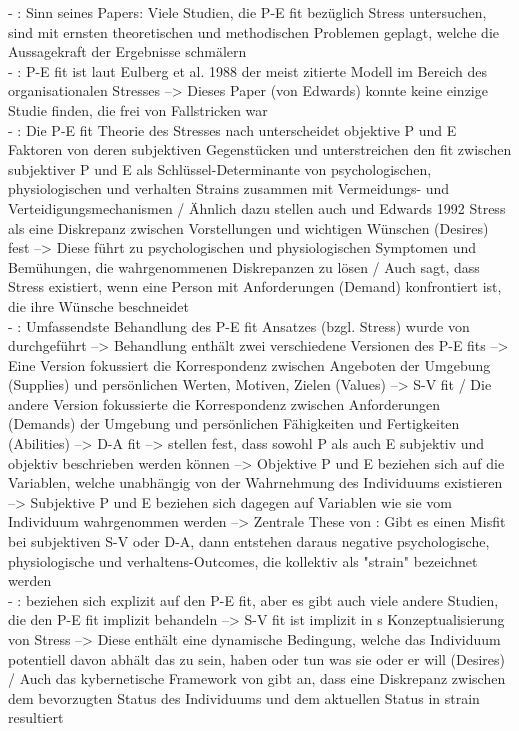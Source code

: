 - \cite[S. 2]{edwards:1990}: Sinn seines Papers: Viele Studien, die P-E fit bezüglich Stress untersuchen, sind mit ernsten theoretischen und methodischen Problemen geplagt, welche die Aussagekraft der Ergebnisse schmälern \\
- \cite[S. 2]{edwards:1990}: P-E fit ist laut Eulberg et al. 1988 der meist zitierte Modell im Bereich des organisationalen Stresses --> Dieses Paper (von Edwards) konnte keine einzige Studie finden, die frei von Fallstricken war \\
- \cite[S. 4]{edwards:2017}: Die P-E fit Theorie des Stresses nach \cite{mechanismsOfJobStressAndStrain:1982} unterscheidet objektive P und E Faktoren von deren subjektiven Gegenstücken und unterstreichen den fit zwischen subjektiver P und E als Schlüssel-Determinante von psychologischen, physiologischen und verhalten Strains zusammen mit Vermeidungs- und Verteidigungsmechanismen / Ähnlich dazu stellen auch \cite{cummings:1979} und Edwards 1992 Stress als eine Diskrepanz zwischen Vorstellungen und wichtigen Wünschen (Desires) fest --> Diese führt zu psychologischen und physiologischen Symptomen und Bemühungen, die wahrgenommenen Diskrepanzen zu lösen / Auch \cite{schuler:1980} sagt, dass Stress existiert, wenn eine Person mit Anforderungen (Demand) konfrontiert ist, die ihre Wünsche beschneidet\\
- \cite[S. 2]{edwards:1990}: Umfassendste Behandlung des P-E fit Ansatzes (bzgl. Stress) wurde von \textcite{mechanismsOfJobStressAndStrain:1982} durchgeführt --> Behandlung enthält zwei verschiedene Versionen des P-E fits --> Eine Version fokussiert die Korrespondenz zwischen Angeboten der Umgebung (Supplies) und persönlichen Werten, Motiven, Zielen (Values) --> S-V fit / Die andere Version fokussierte die Korrespondenz zwischen Anforderungen (Demands) der Umgebung und persönlichen Fähigkeiten und Fertigkeiten (Abilities) --> D-A fit --> \textcite{mechanismsOfJobStressAndStrain:1982} stellen fest, dass sowohl P als auch E subjektiv und objektiv beschrieben werden können --> Objektive P und E beziehen sich auf die Variablen, welche unabhängig von der Wahrnehmung des Individuums existieren --> Subjektive P und E beziehen sich dagegen auf Variablen wie sie vom Individuum wahrgenommen werden --> Zentrale These von \textcite{mechanismsOfJobStressAndStrain:1982}: Gibt es einen Misfit bei subjektiven S-V oder D-A, dann entstehen daraus negative psychologische, physiologische und verhaltens-Outcomes, die kollektiv als "strain" bezeichnet werden \\
- \cite[S. 2]{edwards:1990}: \textcite{mechanismsOfJobStressAndStrain:1982} beziehen sich explizit auf den P-E fit, aber es gibt auch viele andere Studien, die den P-E fit implizit behandeln --> S-V fit ist implizit in \textcite{schuler:1980}s Konzeptualisierung von Stress --> Diese enthält eine dynamische Bedingung, welche das Individuum potentiell davon abhält das zu sein, haben oder tun was sie oder er will (Desires) / Auch das kybernetische Framework von \textcite{cummings:1979} gibt an, dass eine Diskrepanz zwischen dem bevorzugten Status des Individuums und dem aktuellen Status in strain resultiert \\
